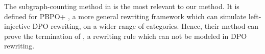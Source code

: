 The subgraph-counting method in \cite{Overbeek2024subgraph} is the most relevant to our method. It is defined for PBPO+ \cite{overbeek2023graph}, a more general rewriting framework which can simulate left-injective DPO rewriting, on a wider range of categories. Hence, their method can prove the termination of \cite[Examples 5.7]{Overbeek2024subgraph}, a rewriting rule which can not be modeled in DPO rewriting.
